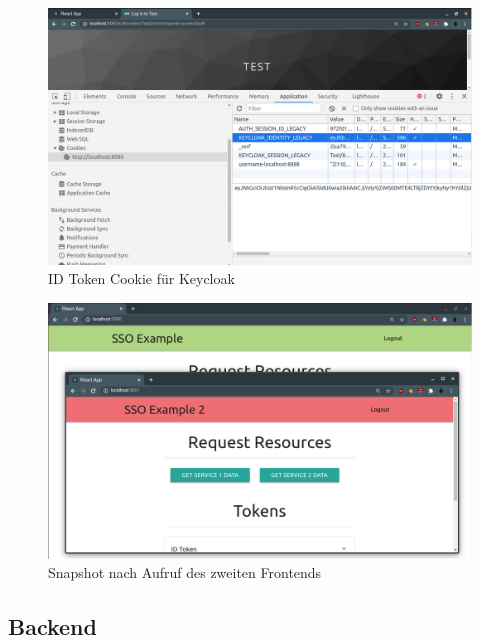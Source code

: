 \begin{figure}[!ht]
	\centering
	\includegraphics[width=1\textwidth]{Images/Ebert/FrontendCookieForKeycloak.PNG}
	\caption{ID Token Cookie für Keycloak}
	\label{fig:EB_ID Token Cookie für Keycloak}
\end{figure}

\begin{figure}[!ht]
	\centering
	\includegraphics[width=1\textwidth]{Images/Ebert/FrontendOpenSecondFrontend.PNG}
	\caption{Snapshot nach Aufruf des zweiten Frontends}
	\label{fig:EB_Snapshot nach Aufruf des zweiten Frontends}
\end{figure}



\subsection{Backend} \label{EB_Backend}

